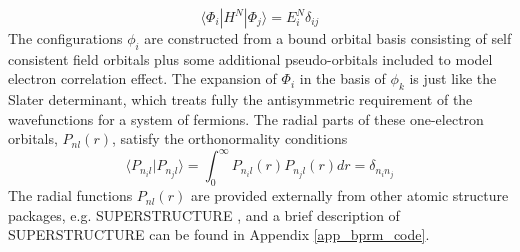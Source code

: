 \begin{equation} \label{eq_dia_target}
	\langle\Phi_i|H^N|\Phi_j\rangle=E_i^N\delta_{ij}
\end{equation}
The configurations $\phi_i$ are constructed from a bound orbital basis consisting of self consistent field orbitals plus some additional pseudo-orbitals included to model electron correlation effect. The expansion of $\Phi_i$ in the basis of $\phi_k$ is just like the Slater determinant, which treats fully the antisymmetric requirement of the wavefunctions for a system of fermions. The radial parts of these one-electron orbitals, $P_{nl}(r)$, satisfy the orthonormality conditions 
\begin{equation}
	\langle P_{n_il}|P_{n_jl} \rangle = \int_{0}^{\infty} P_{n_il}(r)P_{n_jl}(r)dr=\delta_{n_in_j}
\end{equation}
The radial functions $P_{nl}(r)$ are provided externally from other atomic structure packages, e.g. SUPERSTRUCTURE \citep{ss_1, ss_2, ss_3}, and a brief description of SUPERSTRUCTURE can be found in Appendix \ref{app_bprm_code}. 

